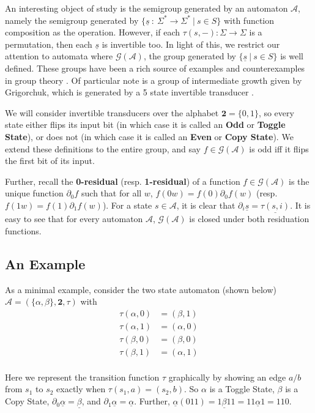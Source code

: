 \documentclass[runningheads]{llncs}
\newcommand{\A}{\mathcal{A}}
\newcommand{\G}{\mathcal{G}}
\newcommand{\2}{\textbf{2}}
\newcommand{\del}{\partial}
\begin{document}
An interesting object of study is the semigroup generated by an automaton $\A$,
namely the semigroup generated by 
$\{ \underline{s}~:~\Sigma^* \to \Sigma^*~|~s \in S \}$ with function 
composition as the operation.
However, if each $\tau(s,-) : \Sigma \to \Sigma$ is a permutation,
then each $\underline{s}$ is invertible too. In light of this,
we restrict our attention to automata where $\G(\A)$, the group generated by 
$\{ \underline{s}~|~s \in S \}$ is well defined. These groups have been a rich
source of examples and counterexamples in group theory 
\cite{Nekrashevych05:self_similar_groups%
     ,Sidki00:one_rooted_trees%
     ,GrigorchukNS00:automata_groups%
     }. 
Of particular note is a group of intermediate growth given by Grigorchuk,
which is generated by a 5 state invertible transducer
\cite{GrigorchukNS00:automata_groups}.

We will consider invertible transducers over the alphabet $\2 = \{0,1\}$, 
so every state either flips its input bit
(in which case it is called an \textbf{Odd} or \textbf{Toggle State}), 
or does not
(in which case it is called an \textbf{Even} or \textbf{Copy State}).
We extend these definitions to the entire group, and say $f \in \G(\A)$ 
is odd iff it flips the first bit of its input.

Further, recall the \textbf{0-residual} (resp. \textbf{1-residual}) of a 
function $f \in \G(\A)$ is the unique function 
$\del_0 f$ such that for all $w$, $f(0w) = f(0) \del_0 f(w)$ 
(resp. $f(1w) = f(1) \del_1 f(w)$). 
For a state $s \in \A$, it is clear that 
$\del_i \underline{s} = \underline{\tau(s,i)}$.
It is easy to see that for every automaton $\A$, $\G(\A)$ is closed
under both residuation functions.

\subsection{An Example}
As a minimal example, consider the two state automaton (shown below)\\
$\A = (\{ \alpha, \beta \}, \2, \tau)$
with 
\begin{align*}
  \tau(\alpha,0) &= (\beta, 1)\\
  \tau(\alpha,1) &= (\alpha,0)\\
  \tau(\beta, 0) &= (\beta, 0)\\
  \tau(\beta, 1) &= (\alpha,1)\\
\end{align*}

Here we represent the transition function $\tau$ graphically by showing
an edge $a/b$ from $s_1$ to $s_2$ exactly when $\tau(s_1,a) = (s_2,b)$.
So $\alpha$ is a Toggle State, $\beta$ is a Copy State, 
$\del_0 \underline{\alpha} = \underline{\beta}$, 
and $\del_1 \underline{\alpha} = \underline{\alpha}$.
Further,
$\underline{\alpha}(011) = 1\underline{\beta}11 = 11\underline{\alpha}1 = 110$.
\end{document}
